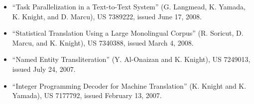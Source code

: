 \begin{itemize}
\item ``Task Parallelization in a Text-to-Text System''
(G. Langmead, K. Yamada, K. Knight, and D. Marcu),
US 7389222, issued June 17, 2008.

\item ``Statistical Translation Using a Large Monolingual Corpus''
(R. Soricut, D. Marcu, and K. Knight),
US 7340388, issued March 4, 2008.

\item ``Named Entity Transliteration'' (Y. Al-Onaizan and K. Knight),
US 7249013, issued July 24, 2007.

\item ``Integer Programming Decoder for Machine Translation''
(K. Knight and K. Yamada),
US 7177792, issued February 13, 2007.
\end{itemize}









\vspace{0.2in}

